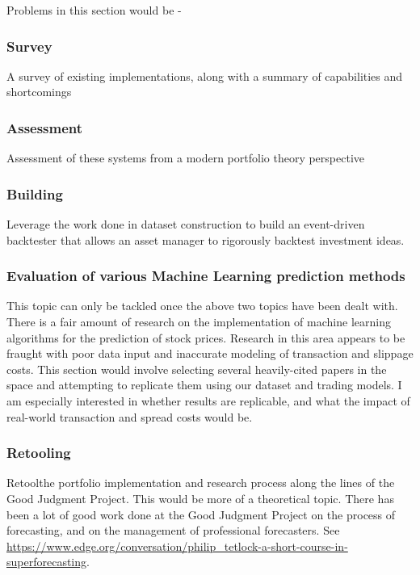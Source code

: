 \documentclass[11pt,preprint, authoryear]{elsarticle}
\numberwithin{equation}{section}
\numberwithin{figure}{section}
\numberwithin{table}{section}
\begin{document}
Problems in this section would be -

\subsubsection{Survey}\label{survey}

A survey of existing implementations, along with a summary of
capabilities and shortcomings

\subsubsection{Assessment}\label{assessment}

Assessment of these systems from a modern portfolio theory perspective

\subsubsection{Building}\label{building}

Leverage the work done in dataset construction to build an event-driven
backtester that allows an asset manager to rigorously backtest
investment ideas.

\subsubsection{Evaluation of various Machine Learning prediction
methods}\label{evaluation-of-various-machine-learning-prediction-methods}

This topic can only be tackled once the above two topics have been dealt
with. There is a fair amount of research on the implementation of
machine learning algorithms for the prediction of stock prices. Research
in this area appears to be fraught with poor data input and inaccurate
modeling of transaction and slippage costs. This section would involve
selecting several heavily-cited papers in the space and attempting to
replicate them using our dataset and trading models. I am especially
interested in whether results are replicable, and what the impact of
real-world transaction and spread costs would be.

\subsubsection{Retooling}\label{retooling}

Retoolthe portfolio implementation and research process along the lines
of the Good Judgment Project. This would be more of a theoretical topic.
There has been a lot of good work done at the Good Judgment Project on
the process of forecasting, and on the management of professional
forecasters. See
\url{https://www.edge.org/conversation/philip_tetlock-a-short-course-in-superforecasting}.
\end{document}
